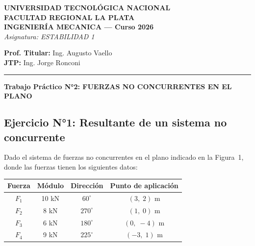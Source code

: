 \documentclass[11pt,a4paper]{article}
\begin{document}
\begin{center}
    \textbf{UNIVERSIDAD TECNOLÓGICA NACIONAL \\ FACULTAD REGIONAL LA PLATA} \\
    \vspace{0.2cm}
    \textbf{INGENIERÍA MECANICA — Curso 2026} \\
    \vspace{0.2cm}
    \textit{Asignatura: ESTABILIDAD 1}
\end{center}

\vspace{0.3cm}

\begin{flushleft}
    \textbf{Prof. Titular:} Ing. Augusto Vaello \\
    \textbf{JTP:} Ing. Jorge Ronconi \\
\end{flushleft}

\noindent\rule{\linewidth}{0.4pt}

\begin{center}
    \vspace{0.4cm}
    \Large \textbf{Trabajo Práctico N°2: FUERZAS NO CONCURRENTES EN EL PLANO} \\
    \vspace{0.4cm}
\end{center}

\subsection*{Ejercicio N°1: Resultante de un sistema no concurrente}

Dado el sistema de fuerzas no concurrentes en el plano indicado en la Figura~1,
donde las fuerzas tienen los siguientes datos:

\begin{center}
\begin{tabular}{cccc}
\hline
\textbf{Fuerza} & \textbf{Módulo} & \textbf{Dirección} & \textbf{Punto de aplicación} \\
\hline
$F_1$ & 10 kN & $60^\circ$  & $( 3,\; 2)$ m \\
$F_2$ & 8 kN  & $270^\circ$ & $( 1,\; 0)$ m \\
$F_3$ & 6 kN  & $180^\circ$ & $( 0,\;-4)$ m \\
$F_4$ & 9 kN  & $225^\circ$ & $(-3,\; 1)$ m \\
\hline
\end{tabular}
\end{center}
\end{document}
